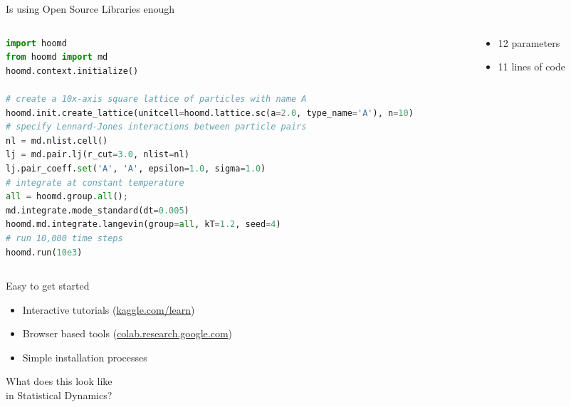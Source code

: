 \documentclass[aspectratio=169, 14pt]{beamer}
\begin{document}
\begin{frame}[fragile]{Is using Open Source Libraries enough}

  \begin{columns}
    \begin{column}{0.7\textwidth}
      \scriptsize
      \begin{lstlisting}[language=python]
import hoomd
from hoomd import md
hoomd.context.initialize()

# create a 10x-axis square lattice of particles with name A
hoomd.init.create_lattice(unitcell=hoomd.lattice.sc(a=2.0, type_name='A'), n=10)
# specify Lennard-Jones interactions between particle pairs
nl = md.nlist.cell()
lj = md.pair.lj(r_cut=3.0, nlist=nl)
lj.pair_coeff.set('A', 'A', epsilon=1.0, sigma=1.0)
# integrate at constant temperature
all = hoomd.group.all();
md.integrate.mode_standard(dt=0.005)
hoomd.md.integrate.langevin(group=all, kT=1.2, seed=4)
# run 10,000 time steps
hoomd.run(10e3)
      \end{lstlisting}
    \end{column}

    \begin{column}{0.3\textwidth}
      \vspace{3em}
      \begin{itemize}
        \item 12 parameters
        \item 11 lines of code
      \end{itemize}
    \end{column}
  \end{columns}

\end{frame}


\begin{frame}{Easy to get started}
  \begin{itemize}
    \item Interactive tutorials (\url{kaggle.com/learn})
    \item Browser based tools (\url{colab.research.google.com})
    \item Simple installation processes
  \end{itemize}
\end{frame}


\begin{frame}{}

  \color{usydred}
  \LARGE
  What does this look like \\
  in Statistical Dynamics?

\end{frame}
\end{document}
